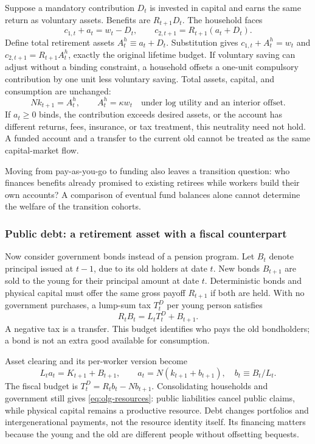 Suppose a mandatory contribution $D_t$ is invested in capital and earns the
same return as voluntary assets. Benefits are $R_{t+1}D_t$. The household faces
\begin{equation}
c_{1,t}+a_t=w_t-D_t,\qquad
c_{2,t+1}=R_{t+1}(a_t+D_t).
\end{equation}
Define total retirement assets $A_t^h\equiv a_t+D_t$. Substitution gives
$c_{1,t}+A_t^h=w_t$ and $c_{2,t+1}=R_{t+1}A_t^h$, exactly the original
lifetime budget. If voluntary saving can adjust without a binding constraint,
a household offsets a one-unit compulsory contribution by one unit less
voluntary saving. Total assets, capital, and consumption are unchanged:
\begin{equation}
Nk_{t+1}=A_t^h,\qquad A_t^h=\kappa w_t
\quad\text{under log utility and an interior offset.}
\end{equation}
If $a_t\geq0$ binds, the contribution exceeds desired assets, or the account
has different returns, fees, insurance, or tax treatment, this neutrality need
not hold. A funded account and a transfer to the current old cannot be treated
as the same capital-market flow.

Moving from pay-as-you-go to funding also leaves a transition question:
who finances benefits already promised to existing retirees while workers
build their own accounts? A comparison of eventual fund balances alone
cannot determine the welfare of the transition cohorts.

\subsubsection{Public debt: a retirement asset with a fiscal counterpart}

Now consider government bonds instead of a pension program. Let $B_t$ denote
principal issued at $t-1$, due to its old holders at date $t$. New bonds
$B_{t+1}$ are sold to the young for their principal amount at date $t$.
Deterministic bonds and physical capital must offer the same gross payoff
$R_{t+1}$ if both are held. With no government purchases, a lump-sum tax
$T_t^D$ per young person satisfies
\begin{equation}\label{eq:olg-government-debt}
R_tB_t=L_tT_t^D+B_{t+1}.
\end{equation}
A negative tax is a transfer. This budget identifies who pays the old
bondholders; a bond is not an extra good available for consumption.

Asset clearing and its per-worker version become
\begin{equation}\label{eq:olg-debt-assets}
L_ta_t=K_{t+1}+B_{t+1},\qquad
 a_t=N(k_{t+1}+b_{t+1}),\quad b_t\equiv B_t/L_t.
\end{equation}
The fiscal budget is $T_t^D=R_tb_t-Nb_{t+1}$. Consolidating households and
government still gives \eqref{eq:olg-resources}: public liabilities cancel
public claims, while physical capital remains a productive resource.
Debt changes portfolios and intergenerational payments, not the resource
identity itself. Its financing matters because the young and the old are
different people without offsetting bequests.

